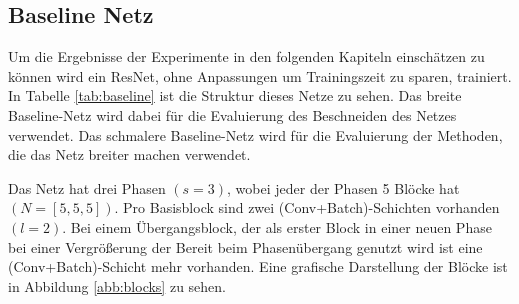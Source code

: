\subsection{Baseline Netz}\label{sec:baseline}

Um die Ergebnisse der Experimente in den folgenden Kapiteln einschätzen zu können wird ein ResNet, ohne Anpassungen um Trainingszeit zu sparen, trainiert. In Tabelle \ref{tab:baseline} ist die Struktur dieses Netze zu sehen. Das breite Baseline-Netz wird dabei für die Evaluierung des Beschneiden des Netzes verwendet. Das schmalere Baseline-Netz wird für die Evaluierung der Methoden, die das Netz breiter machen verwendet.

Das Netz hat drei Phasen $(s=3)$, wobei jeder der Phasen 5 Blöcke hat $(N=[5,5,5])$. Pro Basisblock sind zwei (Conv+Batch)-Schichten vorhanden $(l=2)$. Bei einem Übergangsblock, der als erster Block in einer neuen Phase bei einer Vergrößerung der Bereit beim Phasenübergang genutzt wird ist eine (Conv+Batch)-Schicht mehr vorhanden. Eine grafische Darstellung der Blöcke ist in Abbildung \ref{abb:blocks} zu sehen.




